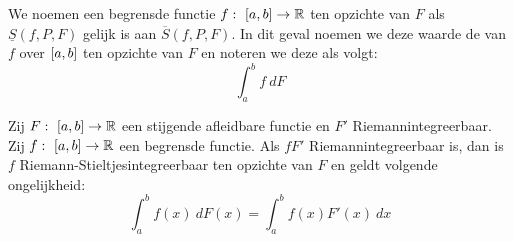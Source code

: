 \documentclass[main.tex]{subfiles}
\begin{document}
\begin{de}
  We noemen een begrensde functie $f:\ \interval{a}{b} \rightarrow \mathbb{R}$  ten opzichte van $F$ als $\underline{S}(f,P,F)$ gelijk is aan $\overline{S}(f,P,F)$.
  In dit geval noemen we deze waarde de  van $f$ over $\interval{a}{b}$ ten opzichte van $F$ en noteren we deze als volgt:
  \[ \int_{a}^{b}f\ dF \]
\end{de}

\begin{bst}
  Zij $F:\ \interval{a}{b}\rightarrow \mathbb{R}$ een stijgende afleidbare functie en $F'$ Riemannintegreerbaar.
  Zij $f:\ \interval{a}{b} \rightarrow \mathbb{R}$ een begrensde functie.
  Als $fF'$ Riemannintegreerbaar is, dan is $f$ Riemann-Stieltjesintegreerbaar ten opzichte van $F$ en geldt volgende ongelijkheid:
  \[ \int_{a}^{b}f(x)\ dF(x) = \int_{a}^{b}f(x)F'(x)\ dx \]
\end{bst}
\end{document}
